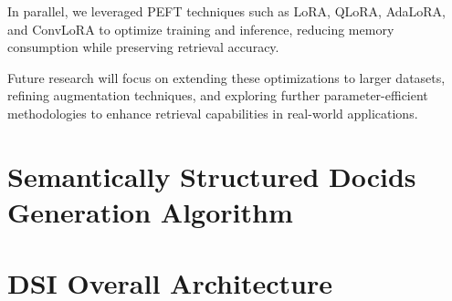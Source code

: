 \documentclass{article}
\begin{document}
In parallel, we leveraged PEFT techniques such as LoRA, QLoRA, AdaLoRA, and ConvLoRA to optimize training and inference, reducing memory consumption while preserving retrieval accuracy. 

Future research will focus on extending these optimizations to larger datasets, refining augmentation techniques, and exploring further parameter-efficient methodologies to enhance retrieval capabilities in real-world applications.




  
  

\appendix
\section{Semantically Structured Docids Generation Algorithm}
\label{sec:semanticids}


\section{DSI Overall Architecture}

\end{document}
